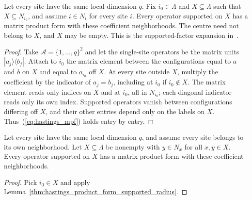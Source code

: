 \begin{lemma}
    \label{thm:hastings_product_form_supported_radius}
    \leanok
    Let every site have the same local dimension $q$.
    Fix $i_0\in\Lambda$ and $X\subseteq\Lambda$ such that
    $X\subseteq N_{i_0}$, and assume $i\in N_i$ for every site $i$.
    Every operator supported on $X$ has a matrix product form with these
    coefficient neighborhoods.
    The centre need not belong to $X$, and $X$ may be empty.
    This is the supported-factor expansion
    in~\cite[lines 1053--1061]{Hastings2006Solving}.
\end{lemma}
\begin{proof}\leanok
    Take $\mathcal A=\{1,\dots,q\}^2$ and let the single-site operators be
    the matrix units $|a_j\rangle\langle b_j|$. Attach to $i_0$ the matrix
    element between the configurations equal to $a$ and $b$ on $X$ and
    equal to $a_{i_0}$ off $X$. At every site outside $X$, multiply the
    coefficient by the indicator of $a_j=b_j$, including at $i_0$ if
    $i_0\notin X$. The matrix element reads only indices on $X$ and at
    $i_0$, all in $N_{i_0}$; each diagonal indicator reads only its
    own index. Supported operators vanish between configurations differing
    off $X$, and their other entries depend only on the labels on $X$.
    Thus~(\ref{eq:hastings_mpf}) holds entry by entry.
\end{proof}

\begin{lemma}
    \label{thm:hastings_product_form_supported}
    \leanok
    Let every site have the same local dimension $q$, and assume every site
    belongs to its own neighborhood. Let $X\subseteq\Lambda$ be nonempty
    with $y\in N_x$ for all $x,y\in X$.
    Every operator supported on $X$ has a matrix product form with these
    coefficient neighborhoods.
\end{lemma}
\begin{proof}\leanok
    Pick $i_0\in X$ and apply
    Lemma~\ref{thm:hastings_product_form_supported_radius}.
\end{proof}

